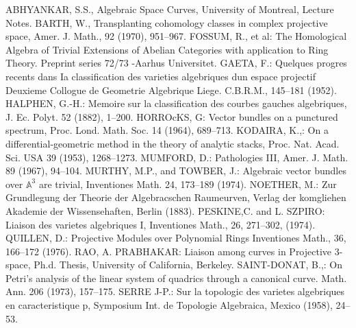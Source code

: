 \begin{thebibliography}{99}\pageoriginale
{} ABHYANKAR, S.S., Algebraic Space Curves, University of
  Montreal, Lecture Notes.
 BARTH, W., Transplanting cohomology classes in complex
  projective space, Amer. J. Math., 92 (1970), 951--967.
 FOSSUM, R., et al: The Homological Algebra of Trivial
  Extensions of Abelian Categories with application to Ring
  Theory. Preprint series 72/73 -Aarhus Universitet.
 GAETA, F.: Quelques progres recents dans Ia
  classification des varieties algebriques dun espace projectif
  Deuxieme Collogue de Geometrie Algebrique Liege. C.B.R.M., 145--181
  (1952).
 HALPHEN, G.-H.: Memoire sur la classification des
  courbes gauches algebriques, J. Ec. Polyt. 52 (1882), 1--200.
 HORROcKS, G: Vector bundles on a punctured spectrum,
  Proc. Lond. Math. Soc. 14 (1964), 689--713.
 KODAIRA, K.,: On a differential-geometric method in the
  theory of analytic stacks, Proc. Nat. Acad. Sci. USA 39 (1953),
  1268--1273.
 MUMFORD, D.: Pathologies III, Amer. J. Math. 89 (1967),
  94--104.
 MURTHY, M.P., and TOWBER, J.: Algebraic vector bundles
  over $\mathbb{A}^3$ are trivial, Inventiones Math. 24, 173--189
  (1974).
 NOETHER, M.: Zur Grundlegung der Theorie der
  Algebracschen Raumeurven, Verlag der komgliehen Akademie der
  Wissensehaften, Berlin (1883).
 PESKINE,\pageoriginale C. and L. SZPIRO: Liaison des
  varietes algebriques I, Inventiones Math., 26, 271--302, (1974).
 QUILLEN, D.: Projective Modules over Polynomial Rings
  Inventiones Math., 36, 166--172 (1976).
 RAO, A. PRABHAKAR: Liaison among curves in Projective
  3-space, Ph.d. Thesis, University of California, Berkeley.
 SAINT-DONAT, B.,: On Petri's analysis of the linear
  system of quadrics through a canonical curve. Math. Ann. 206 (1973),
  157--175.
 SERRE J-P.: Sur la topologic des varietes algebriques
  en caracteristique p, Symposium Int. de Topologie Algebraica, Mexico
  (1958), 24--53.
\end{thebibliography}
